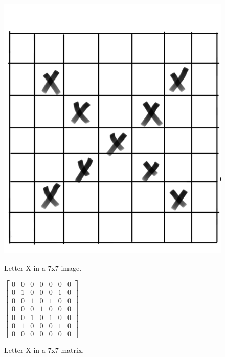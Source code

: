 \begin{figure}[!tbp]
  \centering
  \begin{minipage}[b]{0.4\textwidth}
    \includegraphics[width=\textwidth]{img/X.png}
    \caption{Letter X in a 7x7 image.}
    \label{fig:x_7x7_image}
  \end{minipage}
  \hfill
  \begin{minipage}[b]{0.4\textwidth}
    \centering
    $\begin{bmatrix}
    0 & 0 & 0 & 0 & 0 & 0 & 0\\
    0 & 1 & 0 & 0 & 0 & 1 & 0\\
    0 & 0 & 1 & 0 & 1 & 0 & 0\\
    0 & 0 & 0 & 1 & 0 & 0 & 0\\
    0 & 0 & 1 & 0 & 1 & 0 & 0\\
    0 & 1 & 0 & 0 & 0 & 1 & 0\\
    0 & 0 & 0 & 0 & 0 & 0 & 0
    \end{bmatrix}$
    \caption{Letter X in a 7x7 matrix.}
    \label{fig:x_7x7_matrix}
  \end{minipage}
\end{figure}


